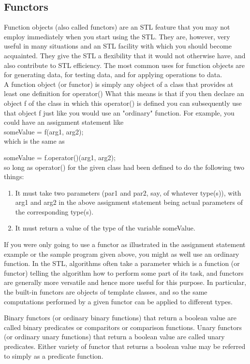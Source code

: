 \subsection{Functors}
Function objects (also called functors) are an STL feature that you may not employ immediately when you start using the STL. They are, however, very useful in many situations and an STL facility with which you should become acquainted. They give the STL a flexibility that it would not otherwise have, and also contribute to STL efficiency. The most common uses for function objects are for generating data, for testing data, and for applying operations to data.\\
A function object (or functor) is simply any object of a class that provides at least one definition for operator() What this means is that if you then declare an object f of the class in which this operator() is defined you can subsequently use that object f just like you would use an "ordinary" function. For example, you could have an assignment statement like\\
someValue = f(arg1, arg2);\\
which is the same as

someValue = f.operator()(arg1, arg2);\\
so long as operator() for the given class had been defined to do the following two things:
\begin{enumerate}
	\item It must take two parameters (par1 and par2, say, of whatever type(s)), with arg1 and arg2 in the above assignment statement being actual parameters of the corresponding type(s).
	\item It must return a value of the type of the variable someValue.
\end{enumerate}
If you were only going to use a functor as illustrated in the assignment statement example or the sample program given above, you might as well use an ordinary function. In the STL, algorithms often take a parameter which is a function (or functor) telling the algorithm how to perform some part of its task, and functors are generally more versatile and hence more useful for this purpose. In particular, the built-in functors are objects of template classes, and so the same computations performed by a given functor can be applied to different types.

Binary functors (or ordinary binary functions) that return a boolean value are called binary predicates or comparitors or comparison functions. Unary functors (or ordinary unary functions) that return a boolean value are called unary predicates. Either variety of functor that returns a boolean value may be referred to simply as a predicate function.
